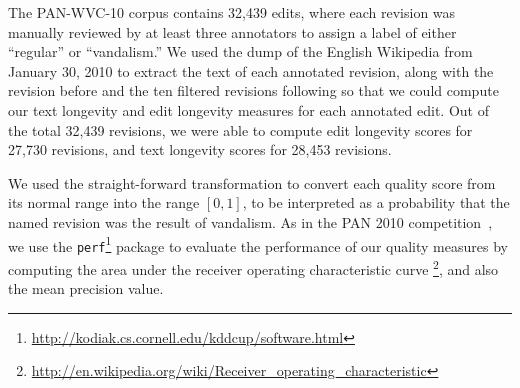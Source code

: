 The PAN-WVC-10 corpus contains 32,439 edits, where each revision was
manually reviewed by at least three annotators to assign a label
of either ``regular'' or ``vandalism.''
We used the dump of the English Wikipedia from January 30, 2010
to extract the text of each annotated revision, along with the revision
before and the ten filtered revisions following so that we could compute
our text longevity and edit longevity measures for each annotated edit.
Out of the total 32,439 revisions, we were able to compute
edit longevity scores for 27,730 revisions, and text longevity
scores for 28,453 revisions.

We used the straight-forward transformation to convert
each quality score from its normal range into the range
$[0,1]$, to be interpreted as a probability that the named
revision was the result of vandalism.
As in the PAN 2010 competition~\cite{Potthast2010b}, we use the
\texttt{perf}\footnote{\url{http://kodiak.cs.cornell.edu/kddcup/software.html}}
package to evaluate the performance of our quality measures
by computing the area under the receiver operating characteristic
curve \footnote{\url{http://en.wikipedia.org/wiki/Receiver_operating_characteristic}},
and also the mean precision value.


